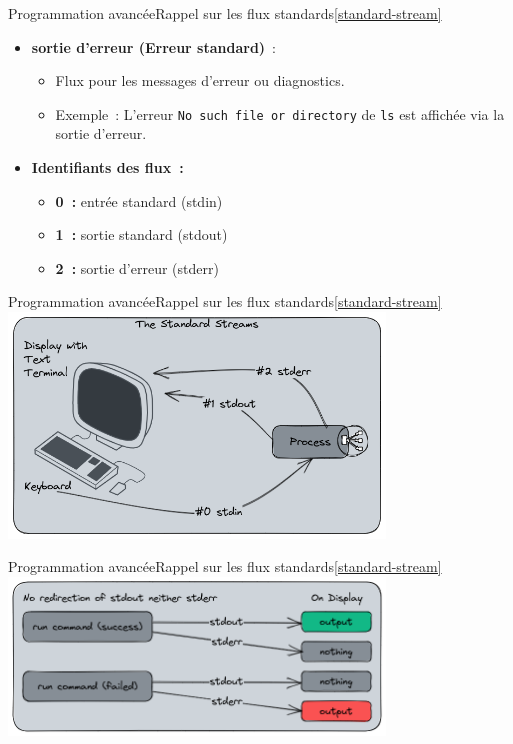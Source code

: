\documentclass{beamer}
\begin{document}
    \begin{frame}{Programmation avancée}{Rappel sur les flux standards\cref{standard-stream}}
        \begin{itemize}
            \item \textbf{sortie d'erreur (Erreur standard)}~:
            \begin{itemize}
                \item Flux pour les messages d'erreur ou diagnostics.
                \item Exemple~: L'erreur \lstinline{No such file or directory} de \lstinline{ls} est affichée via la sortie d'erreur.
            \end{itemize}
            \item \textbf{Identifiants des flux~:}
            \begin{itemize}
                \item \textbf{0~:} entrée standard (stdin)
                \item \textbf{1~:} sortie standard (stdout)
                \item \textbf{2~:} sortie d'erreur (stderr)
            \end{itemize}
        \end{itemize}
    \end{frame}

    \begin{frame}{Programmation avancée}{Rappel sur les flux standards\cref{standard-stream}}
        \centering
        \includegraphics[width=10cm]{image/standard-stream-computer}
    \end{frame}

    \begin{frame}{Programmation avancée}{Rappel sur les flux standards\cref{standard-stream}}
        \centering
        \includegraphics[width=10cm]{image/shell-stream-no-redirect}
    \end{frame}
\end{document}
